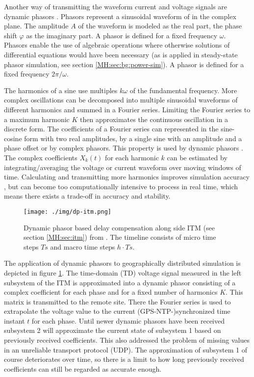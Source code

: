 \documentclass[a4paper,ngerman]{atseminar}
\begin{document}
Another way of transmitting the waveform current and voltage signals are dynamic phasors \cite{mirz2017phasor, stevic2017fidelity}.
Phasors represent a sinusoidal waveform of in the complex plane. The amplitude $A$ of the waveform is modeled as the real part, the phase shift $\varphi$ as the imaginary part. A phasor is defined for a fixed frequency $\omega$.
Phasors enable the use of algebraic operations where otherwise solutions of differential equations would have been necessary (as is applied in steady-state phasor simulation, see section \ref{MH:sec:bg:power-sim}). A phasor is defined for a fixed frequency $2\pi/\omega$.


The harmonics of a sine use multiples $k\omega$ of the fundamental frequency. More complex oscillations can be decomposed into multiple sinusoidal waveforms of different harmonics and summed in a Fourier series. Limiting the Fourier series to a maximum harmonic $K$ then approximates the continuous oscillation in a discrete form. The coefficients of a Fourier series can represented in the sine-cosine form with two real amplitudes, by a single sine with an amplitude and a phase offset or by complex phasors. This property is used by dynamic phasors \cite{stankovic2002}. The complex coefficients $X_k(t)$ for each harmonic $k$ can be estimated by integrating/averaging the voltage or current waveform over moving windows of time. %
Calculating and transmitting more harmonics improves simulation accuracy \cite{stevic2015sim, stevic2017europe}, but can become too computationally intensive to process in real time, which means there exists a trade-off in accuracy and stability.

\begin{figure}[h]
 \centering
  \texttt{[image: ./img/dp-itm.png]}
    \caption{Dynamic phasor based delay compensation along side ITM (see section \ref{MH:sec:itm}) from \cite{stevic2017europe}. The timeline consists of micro time steps $Ts$ and macro time steps $h\cdot Ts$. }
 \label{MH:fig:dp}
\end{figure}

The application of dynamic phasors to geographically distributed simulation is depicted in figure \ref{MH:fig:dp}. 
The time-domain (TD) voltage signal measured in the left subsystem of the ITM is approximated into a dynamic phasor consisting of a complex coefficient for each phase and for a fixed number of harmonics $K$.  This matrix is transmitted to the remote site.
There the Fourier series is used to extrapolate the voltage value to the current (GPS-NTP-)synchronized time instant $t$ for each phase. Until newer dynamic phasors have been received subsystem 2 will approximate the current state of subsystem 1 based on previously received coefficients. This also addressed the problem of missing values in an unreliable transport protocol (UDP). The approximation of subsystem 1 of course deteriorates over time, so there is a limit to how long previously received coefficients can still be regarded as accurate enough.
\cite{stevic2017fidelity}
\end{document}
